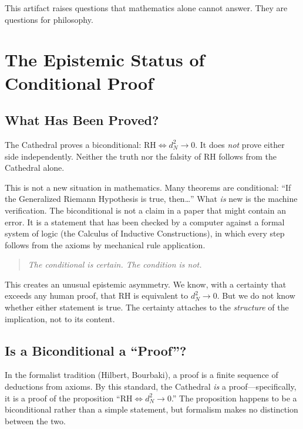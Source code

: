 \documentclass[11pt,a4paper]{article}
\newcommand{\RH}{\ensuremath{\mathrm{RH}}}
\begin{document}
This artifact raises questions that mathematics alone cannot answer.
They are questions for philosophy.

\section{The Epistemic Status of Conditional Proof}
\label{sec:conditional}

\subsection{What Has Been Proved?}

The Cathedral proves a biconditional: $\RH \iff d_N^2 \to 0$. It
does \emph{not} prove either side independently. Neither the truth
nor the falsity of $\RH$ follows from the Cathedral alone.

This is not a new situation in mathematics. Many theorems are
conditional: ``If the Generalized Riemann Hypothesis is true,
then\ldots'' What \emph{is} new is the machine verification. The
biconditional is not a claim in a paper that might contain an error.
It is a statement that has been checked by a computer against a
formal system of logic (the Calculus of Inductive Constructions),
in which every step follows from the axioms by mechanical rule
application.

\begin{quote}
\emph{The conditional is certain. The condition is not.}
\end{quote}

This creates an unusual epistemic asymmetry. We know, with a
certainty that exceeds any human proof, that \RH{} is equivalent to
$d_N^2 \to 0$. But we do not know whether either statement is true.
The certainty attaches to the \emph{structure} of the implication,
not to its content.

\subsection{Is a Biconditional a ``Proof''?}

In the formalist tradition (Hilbert, Bourbaki), a proof is a finite
sequence of deductions from axioms. By this standard, the Cathedral
\emph{is} a proof---specifically, it is a proof of the proposition
``$\RH \iff d_N^2 \to 0$.'' The proposition happens to be a
biconditional rather than a simple statement, but formalism makes no
distinction between the two.
\end{document}

